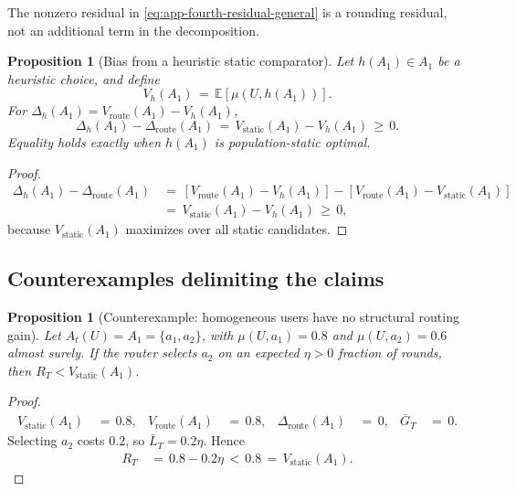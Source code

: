 \documentclass{article} %
\newtheorem{proposition}[theorem]{Proposition}
\begin{document}
The nonzero residual in \eqref{eq:app-fourth-residual-general} is a rounding residual, not an additional term in the decomposition.

\begin{proposition}[Bias from a heuristic static comparator]
\label{prop:7}
Let \(h(A_1)\in A_1\) be a heuristic choice, and define
\begin{equation}
V_h(A_1)
\,=\,
\mathbb{E}[\mu(U,h(A_1))].
\end{equation}
For \(\Delta_h(A_1)=V_{\mathrm{route}}(A_1)-V_h(A_1)\),
\begin{equation}
\Delta_h(A_1)
-
\Delta_{\mathrm{route}}(A_1)
\,=\,
V_{\mathrm{static}}(A_1)-V_h(A_1)
\,\geq\,
0.
\end{equation}
Equality holds exactly when \(h(A_1)\) is population-static optimal.
\end{proposition}

\begin{proof}
\begin{equation}
\begin{aligned}
\Delta_h(A_1)
-
\Delta_{\mathrm{route}}(A_1)
&\,=\,
\left[
V_{\mathrm{route}}(A_1)-V_h(A_1)
\right]
-
\left[
V_{\mathrm{route}}(A_1)-V_{\mathrm{static}}(A_1)
\right]
\\
&\,=\,
V_{\mathrm{static}}(A_1)
-
V_h(A_1)
\,\geq\,0,
\end{aligned}
\end{equation}
because \(V_{\mathrm{static}}(A_1)\) maximizes over all static candidates.
\end{proof}

\subsection{Counterexamples delimiting the claims}

\begin{proposition}[Counterexample: homogeneous users have no structural routing gain]
\label{prop:8}
Let \(A_t(U)=A_1=\{a_1,a_2\}\), with
\(\mu(U,a_1)=0.8\) and \(\mu(U,a_2)=0.6\) almost surely.  If the router selects
\(a_2\) on an expected \(\eta>0\) fraction of rounds, then
\(R_T<V_{\mathrm{static}}(A_1)\).
\end{proposition}

\begin{proof}
\begin{equation}
\begin{aligned}
V_{\mathrm{static}}(A_1)
&\,=\,0.8, &
V_{\mathrm{route}}(A_1)
&\,=\,0.8, &
\Delta_{\mathrm{route}}(A_1)
&\,=\,0, &
\bar G_T
&\,=\,0.
\end{aligned}
\end{equation}
Selecting \(a_2\) costs \(0.2\), so \(\bar L_T=0.2\eta\).  Hence
\begin{equation}
\begin{aligned}
R_T
&\,=\,0.8-0.2\eta
\,<\,0.8
\,=\,V_{\mathrm{static}}(A_1).
\end{aligned}
\end{equation}
\end{proof}
\end{document}
